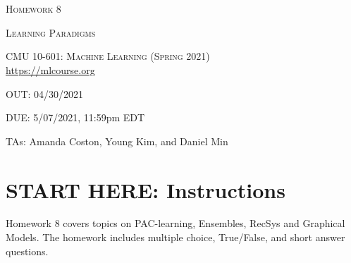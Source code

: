 \documentclass[11pt,addpoints,answers]{exam}
\begin{document}
\section*{}
\begin{center}
  \centerline{\textsc{\LARGE  Homework 8}}
  \vspace{0.5em}
  \centerline{\textsc{\LARGE Learning Paradigms}}
  \textsc{\large CMU 10-601: Machine Learning (Spring 2021)} \\
  \url{https://mlcourse.org}
  \centerline{OUT: 04/30/2021}
  \centerline{DUE: 5/07/2021, 11:59pm EDT}
  \centerline{TAs: Amanda Coston, Young Kim, and Daniel Min}
\end{center}



\section*{START HERE: Instructions}

\begin{notebox}
Homework 8 covers topics on PAC-learning, Ensembles, RecSys and Graphical Models. The homework includes multiple choice, True/False, and short answer questions. 
\end{notebox}
\end{document}
